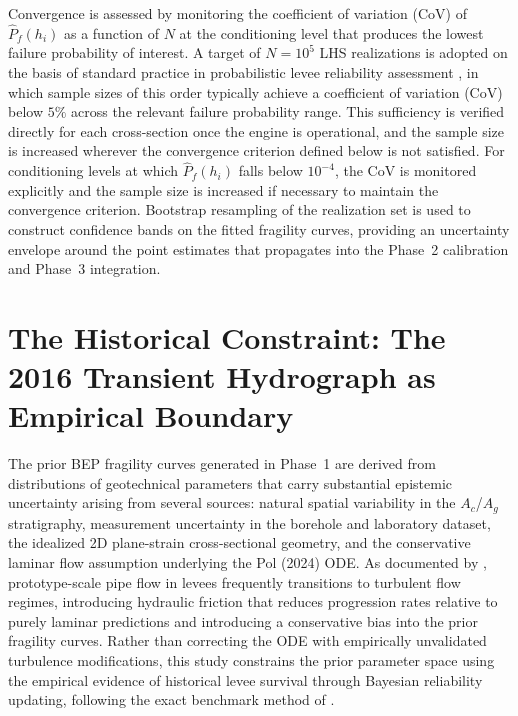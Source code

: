 Convergence is assessed by monitoring the coefficient of variation (CoV) of $\hat{P}_f(h_i)$ as a function of $N$ at the conditioning level that produces the lowest failure probability of interest. A target of $N = 10^5$ LHS realizations is adopted on the basis of standard practice in probabilistic levee reliability assessment \parencite{schweckendiek_2014}, in which sample sizes of this order typically achieve a coefficient of variation (CoV) below $5\%$ across the relevant failure probability range. This sufficiency is verified directly for each cross-section once the engine is operational, and the sample size is increased wherever the convergence criterion defined below is not satisfied. For conditioning levels at which $\hat{P}_f(h_i)$ falls below $10^{-4}$, the CoV is monitored explicitly and the sample size is increased if necessary to maintain the convergence criterion. Bootstrap resampling of the realization set is used to construct confidence bands on the fitted fragility curves, providing an uncertainty envelope around the point estimates that propagates into the Phase~2 calibration and Phase~3 integration.


\section{The Historical Constraint: The 2016 Transient Hydrograph as Empirical Boundary}
\label{sec: The Historical Constraint: The 2016 Transient Hydrograph as Empirical Boundary}

The prior BEP fragility curves generated in Phase~1 are derived from distributions of geotechnical parameters that carry substantial epistemic uncertainty arising from several sources: natural spatial variability in the $A_c$/$A_g$ stratigraphy, measurement uncertainty in the borehole and laboratory dataset, the idealized 2D plane-strain cross-sectional geometry, and the conservative laminar flow assumption underlying the Pol (2024) ODE. As documented by \textcite{Okamura2022, Okamura2025_prediction}, prototype-scale pipe flow in levees frequently transitions to turbulent flow regimes, introducing hydraulic friction that reduces progression rates relative to purely laminar predictions and introducing a conservative bias into the prior fragility curves. Rather than correcting the ODE with empirically unvalidated turbulence modifications, this study constrains the prior parameter space using the empirical evidence of historical levee survival through Bayesian reliability updating, following the exact benchmark method of \textcite{schweckendiek_2014}.

